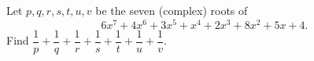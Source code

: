 Let $p,q,r,s,t,u,v$ be the seven (complex) roots of
\[
6x^7+4x^6+3x^5+x^4+2x^3+8x^2+5x+4 .
\]
Find $\dfrac{1}{p}+\dfrac{1}{q}+\dfrac{1}{r}+\dfrac{1}{s}+\dfrac{1}{t}+\dfrac{1}{u}+\dfrac{1}{v}$.
